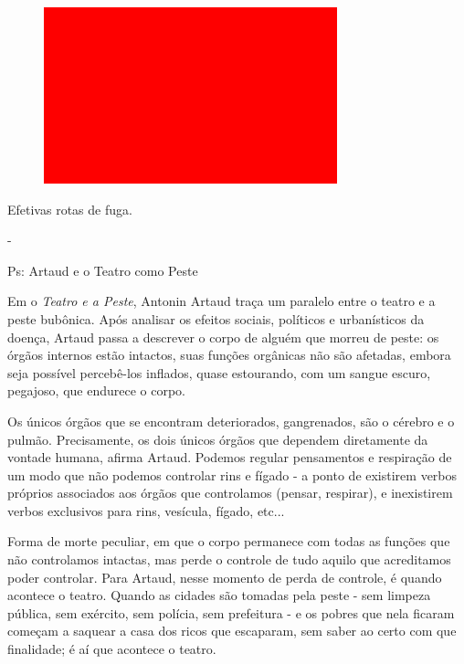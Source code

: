 \begin{figure}[!ht]
\centering
 \includegraphics[width=85mm]{./imgs/im1.jpg}
\caption{\footnotesize{}}
\end{figure}

Efetivas rotas de fuga.

-

Ps: Artaud e o Teatro como Peste

Em o \emph{Teatro e a Peste}, Antonin Artaud traça um paralelo entre o
teatro e a peste bubônica. Após analisar os efeitos sociais, políticos e
urbanísticos da doença, Artaud passa a descrever o corpo de alguém que
morreu de peste: os órgãos internos estão intactos, suas funções
orgânicas não são afetadas, embora seja possível percebê-los inflados,
quase estourando, com um sangue escuro, pegajoso, que endurece o corpo.

Os únicos órgãos que se encontram deteriorados, gangrenados, são o
cérebro e o pulmão. Precisamente, os dois únicos órgãos que dependem
diretamente da vontade humana, afirma Artaud. Podemos regular
pensamentos e respiração de um modo que não podemos controlar rins e
fígado - a ponto de existirem verbos próprios associados aos órgãos que
controlamos (pensar, respirar), e inexistirem verbos exclusivos para
rins, vesícula, fígado, etc...

Forma de morte peculiar, em que o corpo permanece com todas as funções
que não controlamos intactas, mas perde o controle de tudo aquilo que
acreditamos poder controlar. Para Artaud, nesse momento de perda de
controle, é quando acontece o teatro. Quando as cidades são tomadas pela
peste - sem limpeza pública, sem exército, sem polícia, sem prefeitura -
e os pobres que nela ficaram começam a saquear a casa dos ricos que
escaparam, sem saber ao certo com que finalidade; é aí que acontece o
teatro.

